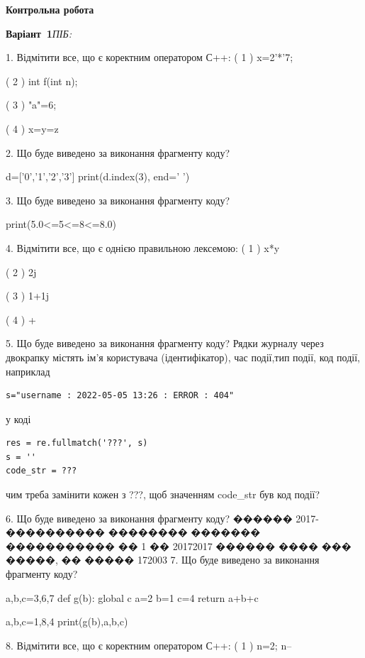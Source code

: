 \documentclass[11pt]{article}
\begin{document}
{\large\textbf{Контрольна робота}}

\textbf{Варіант \No\,1}\hfill \textit{ПІБ:}\,\underline{\hspace{60mm}}
\vspace{4mm}

1. %
Відмітити все, що є коректним оператором С++:
( 1 ) x=2'*'7;

( 2 ) int f(int n);

( 3 ) "a"=6;

( 4 ) x=y=z

2. Що буде виведено за виконання фрагменту коду?

d=['0','1','2','3']
print(d.index(3), end=' ')


3. Що буде виведено за виконання фрагменту коду?

print(5.0<=5<=8<=8.0)

4. %
Відмітити все, що є однією правильною лексемою:
( 1 ) x*y

( 2 ) 2j

( 3 ) 1+1j

( 4 ) +

5. Що буде виведено за виконання фрагменту коду?
Рядки журналу через двокрапку містять ім'я користувача (ідентифікатор), час події,тип події, код події, наприклад
\begin{verbatim}
s="username : 2022-05-05 13:26 : ERROR : 404"
\end{verbatim}
у коді 
\begin{verbatim}
res = re.fullmatch('???', s) 
s = ''
code_str = ??? 
\end{verbatim}
чим треба замінити кожен з ???, щоб значенням code\_str був код події? 



6. Що буде виведено за виконання фрагменту коду?
������ 2017-���������� �������� ������� ����������� �� 1 �� 20172017 ������ ���� ��� �����, �� ����� 172003
7. Що буде виведено за виконання фрагменту коду?

a,b,c=3,6,7
def g(b):
global c    a=2
    b=1
    c=4
    return a+b+c

a,b,c=1,8,4
print(g(b),a,b,c)

8. %
Відмітити все, що є коректним оператором С++:
( 1 ) n=2; n--
\end{document}
